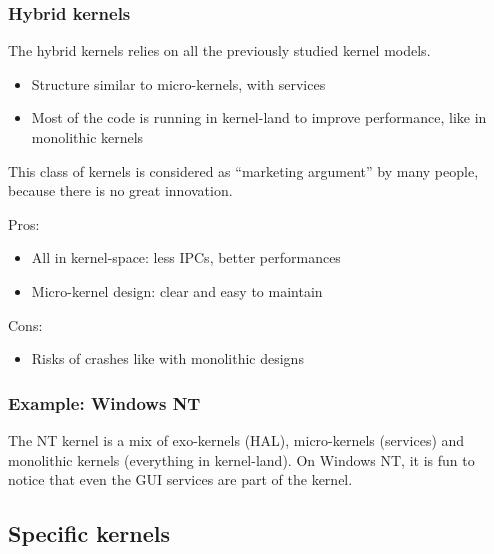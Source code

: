 %
%

\begin{frame}
  \frametitle{Hybrid kernels}

  The hybrid kernels relies on all the previously studied kernel
  models.

  \begin{itemize}
  \item
    Structure similar to micro-kernels, with services
  \item
    Most of the code is running in kernel-land to improve performance,
    like in monolithic kernels
  \end{itemize}

  This class of kernels is considered as ``marketing argument'' by
  many people, because there is no great innovation.

  \-

  Pros:

  \begin{itemize}
  \item
    All in kernel-space: less IPCs, better performances
  \item
    Micro-kernel design: clear and easy to maintain
  \end{itemize}

  \-

  Cons:

  \begin{itemize}
  \item
    Risks of crashes like with monolithic designs
  \end{itemize}

\end{frame}

%
%

\begin{frame}
  \frametitle{Example: Windows NT}

  \begin{center}
  \end{center}

  The NT kernel is a mix of exo-kernels (HAL), micro-kernels
  (services) and monolithic kernels (everything in kernel-land). On
  Windows NT, it is fun to notice that even the GUI services are part
  of the kernel.

\end{frame}

%
%

\subsection{Specific kernels}

